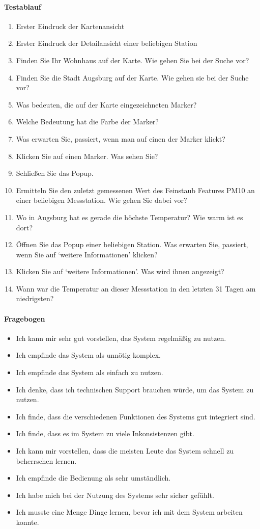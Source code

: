 \paragraph{Testablauf}
\begin{enumerate}
    \item Erster Eindruck der Kartenansicht
 \item Erster Eindruck der Detailansicht einer beliebigen Station
  \item Finden Sie Ihr Wohnhaus auf der Karte. Wie  gehen Sie bei der Suche vor?
 \item  Finden Sie die Stadt Augsburg auf der Karte. Wie gehen sie bei der Suche vor?
 \item Was bedeuten, die auf der Karte eingezeichneten Marker?
  \item Welche Bedeutung hat die Farbe der Marker?
\item Was erwarten Sie, passiert, wenn man auf einen der Marker klickt?
\item Klicken Sie auf einen Marker. Was sehen Sie?
 \item Schließen Sie das Popup.
\item Ermitteln Sie den zuletzt gemessenen Wert des Feinstaub Features PM10 an einer beliebigen Messstation. Wie gehen Sie dabei vor?
\item Wo in Augsburg hat es gerade die höchste Temperatur? Wie warm ist es dort?
\item Öffnen Sie das Popup einer beliebigen Station. Was erwarten Sie, passiert, wenn Sie auf ‘weitere Informationen’ klicken?
\item Klicken Sie auf ‘weitere Informationen’. Was wird ihnen angezeigt?
\item Wann war die Temperatur an dieser Messstation in den letzten 31 Tagen am niedrigsten?

\end{enumerate}
\paragraph{Fragebogen}
\begin{itemize}
  \item  Ich kann mir sehr gut vorstellen, das System regelmäßig zu nutzen.
  \item   Ich empfinde das System als unnötig komplex.
  \item Ich empfinde das System als einfach zu nutzen.
  \item   Ich denke, dass ich technischen Support brauchen würde, um das System zu nutzen.
   \item Ich finde, dass die verschiedenen Funktionen des Systems gut integriert sind.
   \item Ich finde, dass es im System zu viele Inkonsistenzen gibt.
   \item  Ich kann mir vorstellen, dass die meisten Leute das System schnell zu beherrschen lernen.
   \item Ich empfinde die Bedienung als sehr umständlich.
   \item  Ich habe mich bei der Nutzung des Systems sehr sicher gefühlt.
   \item Ich musste eine Menge Dinge lernen, bevor ich mit dem System arbeiten konnte.
\end{itemize}
